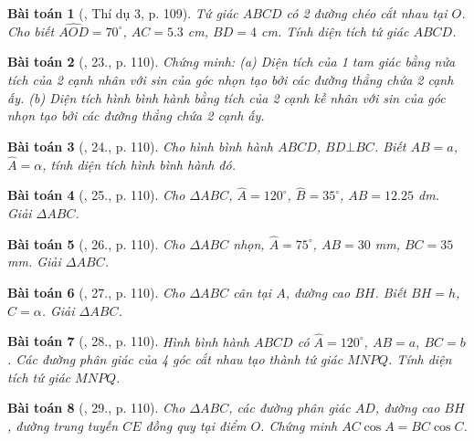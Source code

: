 \documentclass{article}
\newtheorem{baitoan}{Bài toán}
\begin{document}
\begin{baitoan}[\cite{Tuyen_Toan_9}, Thí dụ 3, p. 109]
	Tứ giác $ABCD$ có 2 đường chéo cắt nhau tại $O$. Cho biết $\widehat{AOD} = 70^\circ$, $AC = 5.3$ \emph{cm}, $BD = 4$ \emph{cm}. Tính diện tích tứ giác $ABCD$.
\end{baitoan}

\begin{baitoan}[\cite{Tuyen_Toan_9}, 23., p. 110]
	Chứng minh: (a) Diện tích của 1 tam giác bằng nửa tích của 2 cạnh nhân với sin của góc nhọn tạo bởi các đường thẳng chứa 2 cạnh ấy. (b) Diện tích hình bình hành bằng tích của 2 cạnh kề nhân với sin của góc nhọn tạo bởi các đường thẳng chứa 2 cạnh ấy.
\end{baitoan}

\begin{baitoan}[\cite{Tuyen_Toan_9}, 24., p. 110]
	Cho hình bình hành $ABCD$, $BD\bot BC$. Biết $AB = a$, $\widehat{A} = \alpha$, tính diện tích hình bình hành đó.
\end{baitoan}

\begin{baitoan}[\cite{Tuyen_Toan_9}, 25., p. 110]
	Cho $\Delta ABC$, $\widehat{A} = 120^\circ$, $\widehat{B} = 35^\circ$, $AB = 12.25$ \emph{dm}. Giải $\Delta ABC$.
\end{baitoan}

\begin{baitoan}[\cite{Tuyen_Toan_9}, 26., p. 110]
	Cho $\Delta ABC$ nhọn, $\widehat{A} = 75^\circ$, $AB = 30$ \emph{mm}, $BC = 35$ \emph{mm}. Giải $\Delta ABC$.
\end{baitoan}

\begin{baitoan}[\cite{Tuyen_Toan_9}, 27., p. 110]
	Cho $\Delta ABC$ cân tại $A$, đường cao $BH$. Biết $BH = h$, $\widehat{C} = \alpha$. Giải $\Delta ABC$.
\end{baitoan}

\begin{baitoan}[\cite{Tuyen_Toan_9}, 28., p. 110]
	Hình bình hành $ABCD$ có $\widehat{A} = 120^\circ$, $AB = a$, $BC = b$. Các đường phân giác của 4 góc cắt nhau tạo thành tứ giác $MNPQ$. Tính diện tích tứ giác $MNPQ$.
\end{baitoan}

\begin{baitoan}[\cite{Tuyen_Toan_9}, 29., p. 110]
	Cho $\Delta ABC$, các đường phân giác $AD$, đường cao $BH$, đường trung tuyến $CE$ đồng quy tại điểm $O$. Chứng minh $AC\cos A = BC\cos C$.
\end{baitoan}
\end{document}
